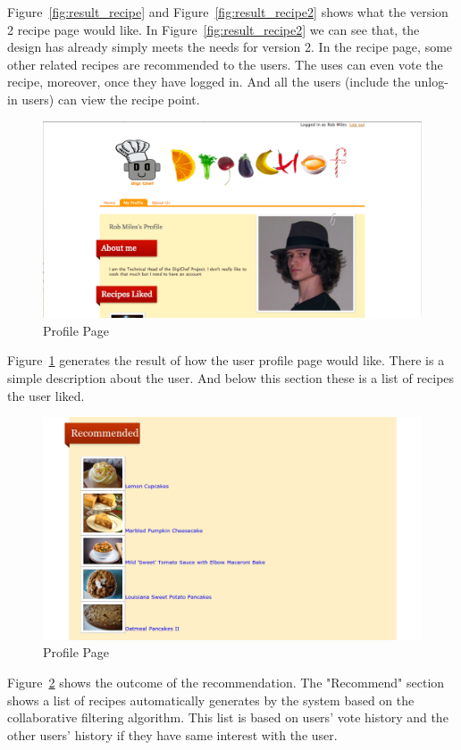 Figure~\ref{fig:result_recipe} and Figure~\ref{fig:result_recipe2} shows what the version 2 recipe page would like. In Figure~\ref{fig:result_recipe2} we can see that, the design has already simply meets the needs for version 2. In the recipe page, some other related recipes are recommended to the users. The uses can even vote the recipe, moreover, once they have logged in. And all the users (include the unlog-in users) can view the recipe point. 

\begin{figure}[H]
\includegraphics[width=1\textwidth]{result_profile}
\caption{Profile Page}
\label{fig:result_profile}
\end{figure}

Figure~\ref{fig:result_profile} generates the result of how the user profile page would like. There is a simple description about the user. And below this section these is a list of recipes the user liked. 

\begin{figure}[H]
\includegraphics[width=1\textwidth]{recommendations}
\caption{Profile Page}
\label{fig:recommendations}
\end{figure}

Figure~\ref{fig:recommendations} shows the outcome of the recommendation. The "Recommend" section shows a list of recipes automatically generates by the system based on the collaborative filtering algorithm. This list is based on users' vote history and the other users' history if they have same interest with the user.

